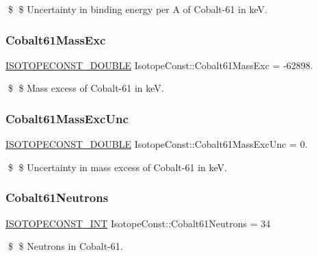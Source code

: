 \$ \$ Uncertainty in binding energy per A of Cobalt-\/61 in keV. \mbox{\label{group___isotope_const-_cobalt-_co61_gaedb8ab49a7afa9af44a1c017f12ac430}} 
\subsubsection{\texorpdfstring{Cobalt61\+Mass\+Exc}{Cobalt61MassExc}}
{\footnotesize\ttfamily \mbox{\hyperlink{group___isotope_const-_macros_ga8f45a7272ce02c0b4c65c44636ed719a}{I\+S\+O\+T\+O\+P\+E\+C\+O\+N\+S\+T\+\_\+\+D\+O\+U\+B\+LE}} Isotope\+Const\+::\+Cobalt61\+Mass\+Exc = -\/62898.}

\$ \$ Mass excess of Cobalt-\/61 in keV. \mbox{\label{group___isotope_const-_cobalt-_co61_ga9bcf3340da933e180e0a14a8445b5de6}} 
\subsubsection{\texorpdfstring{Cobalt61\+Mass\+Exc\+Unc}{Cobalt61MassExcUnc}}
{\footnotesize\ttfamily \mbox{\hyperlink{group___isotope_const-_macros_ga8f45a7272ce02c0b4c65c44636ed719a}{I\+S\+O\+T\+O\+P\+E\+C\+O\+N\+S\+T\+\_\+\+D\+O\+U\+B\+LE}} Isotope\+Const\+::\+Cobalt61\+Mass\+Exc\+Unc = 0.}

\$ \$ Uncertainty in mass excess of Cobalt-\/61 in keV. \mbox{\label{group___isotope_const-_cobalt-_co61_gaad133e438453972046a688648b4519af}} 
\subsubsection{\texorpdfstring{Cobalt61\+Neutrons}{Cobalt61Neutrons}}
{\footnotesize\ttfamily \mbox{\hyperlink{group___isotope_const-_macros_ga5f18360b3e99483a35c32d789e62621c}{I\+S\+O\+T\+O\+P\+E\+C\+O\+N\+S\+T\+\_\+\+I\+NT}} Isotope\+Const\+::\+Cobalt61\+Neutrons = 34}

\$ \$ Neutrons in Cobalt-\/61. \mbox{\label{group___isotope_const-_cobalt-_co61_gaeb03e75c0831f9013d77bb9169eea647}} 
